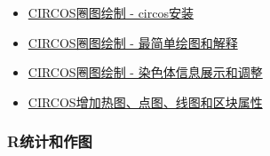 \documentclass[]{article}
\providecommand{\tightlist}{%
  \setlength{\itemsep}{0pt}\setlength{\parskip}{0pt}}
\numberwithin{figure}{section}
\numberwithin{table}{section}
\begin{document}
\begin{itemize}
\tightlist
\item
  \href{http://mp.weixin.qq.com/s/OEBJU3BiQdQOeN_tD2o7sA}{CIRCOS圈图绘制 - circos安装}
\item
  \href{http://mp.weixin.qq.com/s/2E1Y5-cEdptkQGVm0bxKbQ}{CIRCOS圈图绘制 - 最简单绘图和解释}
\item
  \href{https://mp.weixin.qq.com/s/o_3DyYdSubWCh5FfoVKBOg}{CIRCOS圈图绘制 - 染色体信息展示和调整}
\item
  \href{http://mp.weixin.qq.com/s/6L8wmsy0eOxtiAEs3hYgCA}{CIRCOS增加热图、点图、线图和区块属性}
\end{itemize}

\hypertarget{rux7edfux8ba1ux548cux4f5cux56fe}{%
\subsubsection{R统计和作图}\label{rux7edfux8ba1ux548cux4f5cux56fe}}
\end{document}
